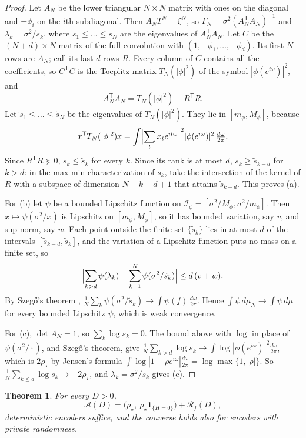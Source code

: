 \documentclass[11pt,onecolumn]{IEEEtran}
\newtheorem{theorem}{Theorem}
\newcommand{\dw}{\tfrac{d\omega}{2\pi}}
\begin{document}
\begin{proof}
Let $A_N$ be the lower triangular $N\times N$ matrix with ones on the
diagonal and $-\phi_i$ on the $i$th subdiagonal. Then $A_NT^N=\xi^N$, so
$\Gamma_N=\sigma^2(A_N^{\mathsf T}A_N)^{-1}$ and $\lambda_k=\sigma^2/s_k$,
where $s_1\le\dots\le s_N$ are the eigenvalues of
$A_N^{\mathsf T}A_N$. Let $C$ be the $(N+d)\times N$ matrix of the full
convolution with $(1,-\phi_1,\dots,-\phi_d)$. Its first $N$ rows are
$A_N$; call its last $d$ rows $R$. Every column of $C$ contains all the
coefficients, so $C^{\mathsf T}C$ is the Toeplitz matrix
$T_N(|\phi|^2)$ of the symbol $|\phi(e^{i\omega})|^2$, and
\[
A_N^{\mathsf T}A_N=T_N(|\phi|^2)-R^{\mathsf T}R .
\]
Let $\tilde s_1\le\dots\le\tilde s_N$ be the eigenvalues of
$T_N(|\phi|^2)$. They lie in $[m_\phi,M_\phi]$, because
\[
x^{\mathsf T}T_N(|\phi|^2)x=\int\Bigl|\sum_tx_te^{it\omega}\Bigr|^2|\phi(e^{i\omega})|^2\,\dw .
\]
Since $R^{\mathsf T}R\succeq0$, $s_k\le\tilde s_k$ for every $k$. Since
its rank is at most $d$, $s_k\ge\tilde s_{k-d}$ for $k>d$: in the
max-min characterization of $s_k$, take the intersection of the kernel
of $R$ with a subspace of dimension $N-k+d+1$ that attains
$\tilde s_{k-d}$. This proves (a).

For (b) let $\psi$ be a bounded Lipschitz function on
$\mathcal I_\phi=[\sigma^2/M_\phi,\sigma^2/m_\phi]$. Then $x\mapsto\psi(\sigma^2/x)$ is
Lipschitz on $[m_\phi,M_\phi]$, so it has bounded variation, say $v$,
and sup norm, say $w$. Each point outside the finite set
$\{\tilde s_k\}$ lies in at most $d$ of the intervals
$[\tilde s_{k-d},\tilde s_k]$, and the variation of a Lipschitz function
puts no mass on a finite set, so
\[
\Bigl|\sum_{k>d}\psi(\lambda_k)-\sum_{k=1}^N\psi(\sigma^2/\tilde s_k)\Bigr|\le d\,(v+w).
\]
By Szeg\H{o}'s theorem \cite{grenander1958},
$\tfrac1N\sum_k\psi(\sigma^2/\tilde s_k)\to\int\psi(f)\,\dw$. Hence
$\int\psi\,d\mu_N\to\int\psi\,d\mu$ for every bounded Lipschitz $\psi$,
which is weak convergence.

For (c), $\det A_N=1$, so $\sum_k\log s_k=0$. The bound above with
$\log$ in place of $\psi(\sigma^2/\cdot)$, and Szeg\H{o}'s theorem, give
$\tfrac1N\sum_{k>d}\log s_k\to\int\log|\phi(e^{i\omega})|^2\dw$, which is
$2\rho_\star$ by Jensen's formula
$\int\log|1-\rho e^{i\omega}|\dw=\log\max\{1,|\rho|\}$. So
$\tfrac1N\sum_{k\le d}\log s_k\to-2\rho_\star$, and $\lambda_k=\sigma^2/s_k$
gives (c).
\end{proof}

\begin{theorem}\label{thm:unstable}
For every $D>0$,
\[
\mathcal A(D)=\bigl(\rho_\star,\ \rho_\star\mathbf 1_{\{H=0\}}\bigr)+\mathcal R_f(D),
\]
deterministic encoders suffice, and the converse holds also for
encoders with private randomness.
\end{theorem}
\end{document}
